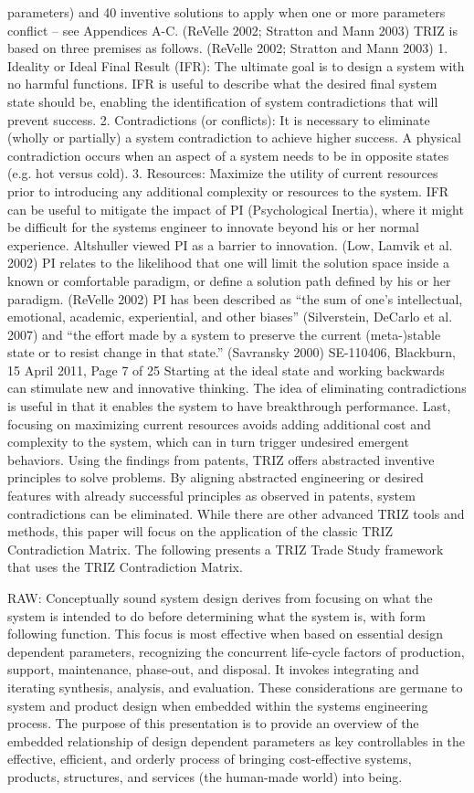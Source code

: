 parameters) and 40 inventive solutions to apply when one or more parameters conflict – see
Appendices A-C. (ReVelle 2002; Stratton and Mann 2003) TRIZ is based on three premises as
follows. (ReVelle 2002; Stratton and Mann 2003)
1. Ideality or Ideal Final Result (IFR): The ultimate goal is to design a system with no
harmful functions. IFR is useful to describe what the desired final system state should be,
enabling the identification of system contradictions that will prevent success.
2. Contradictions (or conflicts): It is necessary to eliminate (wholly or partially) a system
contradiction to achieve higher success. A physical contradiction occurs when an aspect of a
system needs to be in opposite states (e.g. hot versus cold).
3. Resources: Maximize the utility of current resources prior to introducing any additional
complexity or resources to the system.
IFR can be useful to mitigate the impact of PI (Psychological Inertia), where it might be
difficult for the systems engineer to innovate beyond his or her normal experience. Altshuller
viewed PI as a barrier to innovation. (Low, Lamvik et al. 2002) PI relates to the likelihood that
one will limit the solution space inside a known or comfortable paradigm, or define a solution
path defined by his or her paradigm. (ReVelle 2002) PI has been described as “the sum of one’s
intellectual, emotional, academic, experiential, and other biases” (Silverstein, DeCarlo et al.
2007) and “the effort made by a system to preserve the current (meta-)stable state or to resist
change in that state.” (Savransky 2000)
SE-110406, Blackburn, 15 April 2011, Page 7 of 25
Starting at the ideal state and working backwards can stimulate new and innovative thinking.
The idea of eliminating contradictions is useful in that it enables the system to have breakthrough
performance. Last, focusing on maximizing current resources avoids adding additional cost and
complexity to the system, which can in turn trigger undesired emergent behaviors.
Using the findings from patents, TRIZ offers abstracted inventive principles to solve
problems. By aligning abstracted engineering or desired features with already successful
principles as observed in patents, system contradictions can be eliminated. While there are other
advanced TRIZ tools and methods, this paper will focus on the application of the classic TRIZ
Contradiction Matrix. The following presents a TRIZ Trade Study framework that uses the
TRIZ Contradiction Matrix.

RAW:
Conceptually sound system design derives from focusing on what the system is intended to do before determining what the system is, with form following function. This focus is most effective when based on essential design dependent parameters, recognizing the concurrent life-cycle factors of production, support, maintenance, phase-out, and disposal. It invokes integrating and iterating synthesis, analysis, and evaluation. These considerations are germane to system and product design when embedded within the systems engineering process. The purpose of this presentation is to provide an overview of the embedded relationship of design dependent parameters as key controllables in the effective, efficient, and orderly process of bringing cost-effective systems, products, structures, and services (the human-made world) into being.

